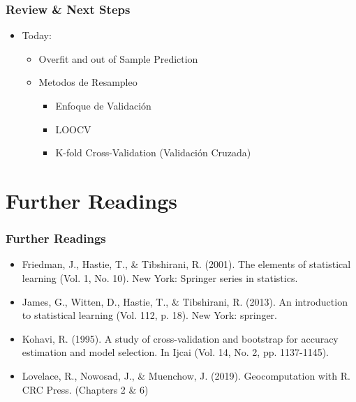 \documentclass[
  shownotes,
  xcolor={svgnames},
  hyperref={colorlinks,citecolor=DarkBlue,linkcolor=DarkRed,urlcolor=DarkBlue}
  , aspectratio=169]{beamer}
\begin{document}
\begin{frame}
\frametitle{Review \& Next Steps}
  
\begin{itemize} 
    \item Today:
    \medskip
    \begin{itemize} 
         \item Overfit and out of Sample Prediction
         \medskip
         \item Metodos de Resampleo
        \begin{itemize}  
            \item Enfoque de Validación
            \medskip
            \item LOOCV
            \medskip
            \item K-fold Cross-Validation (Validación Cruzada)
      \end{itemize}
    \end{itemize}
    \bigskip  




\end{itemize}
\end{frame}

\section{Further Readings}
\begin{frame}
\frametitle{Further Readings}

\begin{itemize}


  \item Friedman, J., Hastie, T., \& Tibshirani, R. (2001). The elements of statistical learning (Vol. 1, No. 10). New York: Springer series in statistics.
  \medskip
  \item James, G., Witten, D., Hastie, T., \& Tibshirani, R. (2013). An introduction to statistical learning (Vol. 112, p. 18). New York: springer.
  \medskip
    \item Kohavi, R. (1995). A study of cross-validation and bootstrap for accuracy estimation and model selection. In Ijcai (Vol. 14, No. 2, pp. 1137-1145).
  \medskip
  \item Lovelace, R., Nowosad, J., \& Muenchow, J. (2019). Geocomputation with R. CRC Press. (Chapters 2 \& 6)
\end{itemize}

\end{frame}
\end{document}
